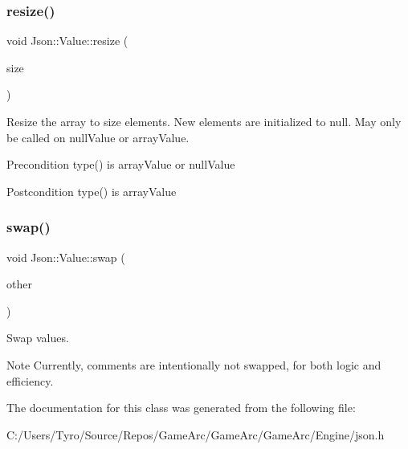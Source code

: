 \subsubsection{\texorpdfstring{resize()}{resize()}}
{\footnotesize\ttfamily void Json\+::\+Value\+::resize (\begin{DoxyParamCaption}\item[{Array\+Index}]{size }\end{DoxyParamCaption})}

Resize the array to size elements. New elements are initialized to null. May only be called on null\+Value or array\+Value. \begin{DoxyPrecond}{Precondition}
type() is array\+Value or null\+Value 
\end{DoxyPrecond}
\begin{DoxyPostcond}{Postcondition}
type() is array\+Value 
\end{DoxyPostcond}
\mbox{\label{class_json_1_1_value_aab841120d78e296e1bc06a373345e822}} 
\subsubsection{\texorpdfstring{swap()}{swap()}}
{\footnotesize\ttfamily void Json\+::\+Value\+::swap (\begin{DoxyParamCaption}\item[{\mbox{\hyperlink{class_json_1_1_value}{Value}} \&}]{other }\end{DoxyParamCaption})}

Swap values. \begin{DoxyNote}{Note}
Currently, comments are intentionally not swapped, for both logic and efficiency. 
\end{DoxyNote}


The documentation for this class was generated from the following file\+:\begin{DoxyCompactItemize}
\item 
C\+:/\+Users/\+Tyro/\+Source/\+Repos/\+Game\+Arc/\+Game\+Arc/\+Game\+Arc/\+Engine/json.\+h\end{DoxyCompactItemize}
